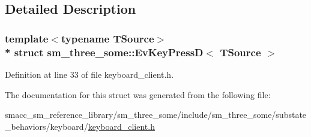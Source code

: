 \subsection{Detailed Description}
\subsubsection*{template$<$typename T\+Source$>$\\*
struct sm\+\_\+three\+\_\+some\+::\+Ev\+Key\+Press\+D$<$ T\+Source $>$}



Definition at line 33 of file keyboard\+\_\+client.\+h.



The documentation for this struct was generated from the following file\+:\begin{DoxyCompactItemize}
\item 
smacc\+\_\+sm\+\_\+reference\+\_\+library/sm\+\_\+three\+\_\+some/include/sm\+\_\+three\+\_\+some/substate\+\_\+behaviors/keyboard/\hyperlink{keyboard__client_8h}{keyboard\+\_\+client.\+h}\end{DoxyCompactItemize}
